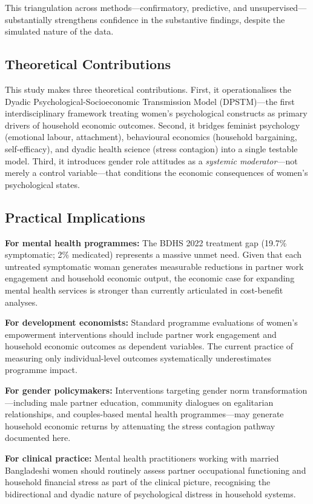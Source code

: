 \documentclass[12pt, a4paper]{article}
\begin{document}
This triangulation across methods—confirmatory, predictive, and unsupervised—substantially strengthens confidence in the substantive findings, despite the simulated nature of the data.

\subsection{Theoretical Contributions}

This study makes three theoretical contributions. First, it operationalises the Dyadic Psychological-Socioeconomic Transmission Model (DPSTM)—the first interdisciplinary framework treating women's psychological constructs as primary drivers of household economic outcomes. Second, it bridges feminist psychology (emotional labour, attachment), behavioural economics (household bargaining, self-efficacy), and dyadic health science (stress contagion) into a single testable model. Third, it introduces gender role attitudes as a \emph{systemic moderator}—not merely a control variable—that conditions the economic consequences of women's psychological states.

\subsection{Practical Implications}

\textbf{For mental health programmes:} The BDHS 2022 treatment gap (19.7\% symptomatic; 2\% medicated) represents a massive unmet need. Given that each untreated symptomatic woman generates measurable reductions in partner work engagement and household economic output, the economic case for expanding mental health services is stronger than currently articulated in cost-benefit analyses.

\textbf{For development economists:} Standard programme evaluations of women's empowerment interventions should include partner work engagement and household economic outcomes as dependent variables. The current practice of measuring only individual-level outcomes systematically underestimates programme impact.

\textbf{For gender policymakers:} Interventions targeting gender norm transformation—including male partner education, community dialogues on egalitarian relationships, and couples-based mental health programmes—may generate household economic returns by attenuating the stress contagion pathway documented here.

\textbf{For clinical practice:} Mental health practitioners working with married Bangladeshi women should routinely assess partner occupational functioning and household financial stress as part of the clinical picture, recognising the bidirectional and dyadic nature of psychological distress in household systems.
\end{document}
